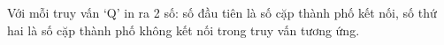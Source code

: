 Với mỗi truy vấn ‘Q’ in ra 2 số: số đầu tiên là số cặp thành phố kết nối, số thứ hai là số cặp thành phố không kết nối trong truy vấn tương ứng.